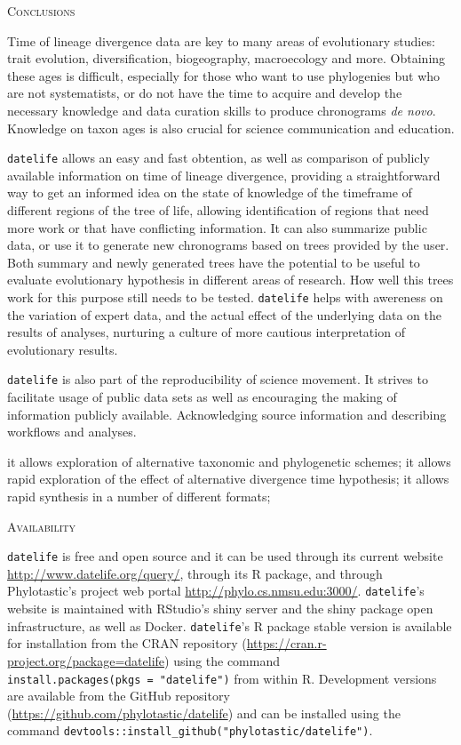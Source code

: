 \documentclass[]{article}
\begin{document}
\begin{center}
\textsc{Conclusions}
\end{center}

Time of lineage divergence data are key to many areas of evolutionary studies: trait evolution,
diversification, biogeography, macroecology and more. Obtaining these ages is difficult,
especially for those who want to use phylogenies but who are not systematists, or
do not have the time to acquire and develop the necessary knowledge and data curation skills
to produce chronograms \emph{de novo}. Knowledge on taxon ages is also crucial for
science communication and education.

\texttt{datelife} allows an easy and fast obtention, as well as comparison of publicly available information
on time of lineage divergence, providing a straightforward way to get an informed idea on the state of knowledge of the timeframe of different regions of the tree of life, allowing identification of regions that need more work or that have conflicting information.
It can also summarize public data, or use it to generate new chronograms based on trees provided by the user.
Both summary and newly generated trees have the potential to be useful to evaluate evolutionary hypothesis in different areas of research. How well this trees work for this purpose still needs to be tested. \texttt{datelife} helps with awereness on the variation of expert data, and the actual effect of the underlying data on the results of analyses, nurturing a culture of more cautious interpretation of evolutionary results.

\texttt{datelife} is also part of the reproducibility of science movement. It strives to facilitate usage of public data sets as well as encouraging the making of information publicly available. Acknowledging source information and describing workflows and analyses.

it allows exploration of alternative taxonomic and phylogenetic schemes;
it allows rapid exploration of the effect of alternative divergence time hypothesis;
it allows rapid synthesis in a number of different formats;

\begin{center}
\textsc{Availability}
\end{center}

\texttt{datelife} is free and open source and it can be used through its current website
\url{http://www.datelife.org/query/}, through its R package, and through Phylotastic's project web portal \url{http://phylo.cs.nmsu.edu:3000/}.
\texttt{datelife}'s website is maintained with RStudio's shiny server and the shiny package open infrastructure, as well as Docker.
\texttt{datelife}'s R package stable version is available
for installation from the CRAN repository (\url{https://cran.r-project.org/package=datelife})
using the command \texttt{install.packages(pkgs\ =\ "datelife")} from within R. Development versions
are available from the GitHub repository (\url{https://github.com/phylotastic/datelife})
and can be installed using the command \texttt{devtools::install\_github("phylotastic/datelife")}.
\end{document}
